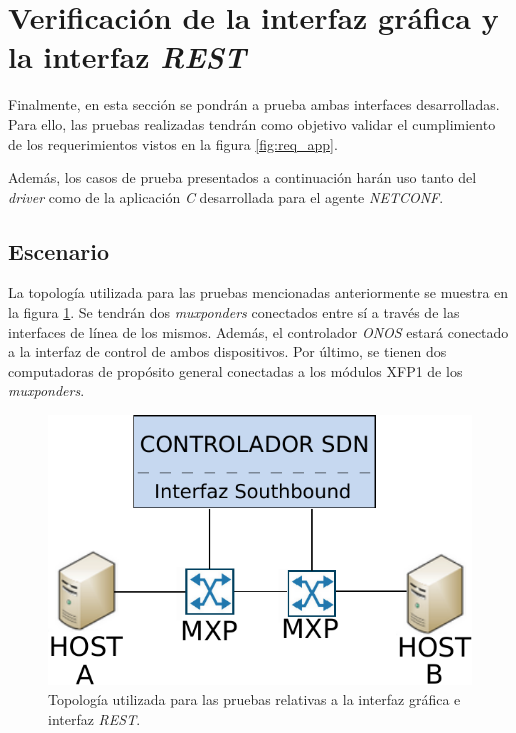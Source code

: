
\section{Verificación de la interfaz gráfica y la interfaz \textit{REST}}

Finalmente, en esta sección se pondrán a prueba ambas interfaces desarrolladas. Para ello, las pruebas realizadas tendrán como objetivo validar el cumplimiento de los requerimientos vistos en la figura \ref{fig:req_app}. 

Además, los casos de prueba presentados a continuación harán uso tanto del \textit{driver} como de la aplicación \textit{C} desarrollada para el agente \textit{NETCONF}.


\subsection{Escenario}

La topología utilizada para las pruebas mencionadas anteriormente se muestra en la figura \ref{fig:test_topo_rest}. 
Se tendrán dos \textit{muxponders} conectados entre sí a través de las interfaces de línea de los mismos. Además, el controlador \textit{ONOS} estará conectado a la interfaz de control de ambos dispositivos. Por último, se tienen dos computadoras de propósito general conectadas a los módulos XFP1 de los \textit{muxponders}.



\begin{figure}[H]
	\centering
	\includegraphics[scale=0.8]{Figures/topologiatest.pdf}
	\caption{Topología utilizada para las pruebas relativas a la interfaz gráfica e interfaz \textit{REST}.}
	\label{fig:test_topo_rest}
  \end{figure}


